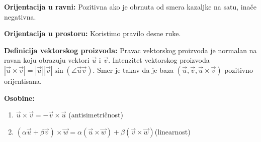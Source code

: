 \documentclass[12pt]{article}
\newcommand{\vek}[1]{\overrightarrow{#1}}
\begin{document}
\textbf{Orijentacija u ravni:} Pozitivna ako je obrnuta od smera kazaljke na
satu, inače negativna.
\par

\textbf{Orijentacija u prostoru:} Koristimo pravilo desne ruke.
\par

\textbf{Definicija vektorskog proizvoda:} Pravac vektorskog proizvoda je
normalan na ravan koju obrazuju vektori $\vek{u}$ i $\vek{v}$. Intenzitet
vektorskog proizvoda $|\vek{u}\times\vek{v}|=|\vek{u}||\vek{v}|
    \sin(\angle{\vek{u}\vek{v}})$. Smer je takav da je baza
$(\vek{u},\vek{v},\vek{u}\times\vek{v})$ pozitivno orijentisana.
\par

\textbf{Osobine:}
\begin{enumerate}[label=\textbf{(\arabic*)}]
    \item $\vek{u}\times\vek{v}=-\vek{v}\times\vek{u}$\hspace*{1cm}
          (antisimetričnost)
    \item $(\alpha\vek{u}+\beta\vek{v})\times\vek{w}=\alpha(\vek{u}
              \times\vek{w})+\beta(\vek{v}\times\vek{w})$\hspace*{1cm}(linearnost)
\end{enumerate}
\par
\end{document}
